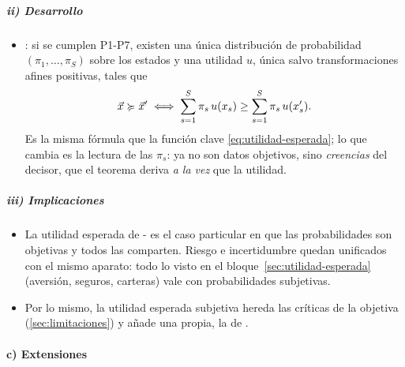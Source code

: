 \documentclass[11pt]{article}
\begin{document}
\subparagraph{ii) Desarrollo}

\begin{itemize}
\item {}: si se cumplen P1-P7, existen una única distribución de probabilidad $(\pi_1,\dots,\pi_S)$ sobre los estados y una utilidad $u$, única salvo transformaciones afines positivas, tales que
  \begin{equation}\label{eq:subjetiva}
  \vec{x}\succcurlyeq\vec{x}'\iff\sum_{s=1}^{S}\pi_s\,u(x_s)\geq\sum_{s=1}^{S}\pi_s\,u(x_s') .
  \end{equation}
  Es la misma fórmula que la función clave \eqref{eq:utilidad-esperada}; lo que cambia es la lectura de las $\pi_s$: ya no son datos objetivos, sino \emph{creencias} del decisor, que el teorema deriva \emph{a la vez} que la utilidad.
\end{itemize}

\subparagraph{iii) Implicaciones}

\begin{itemize}
\item La utilidad esperada de - es el caso particular en que las probabilidades son objetivas y todos las comparten. Riesgo e incertidumbre quedan unificados con el mismo aparato: todo lo visto en el bloque~\ref{sec:utilidad-esperada} (aversión, seguros, carteras) vale con probabilidades subjetivas.
\item Por lo mismo, la utilidad esperada subjetiva hereda las críticas de la objetiva (\ref{sec:limitaciones}) y añade una propia, la de .
\end{itemize}

\paragraph{c) Extensiones}
\end{document}
